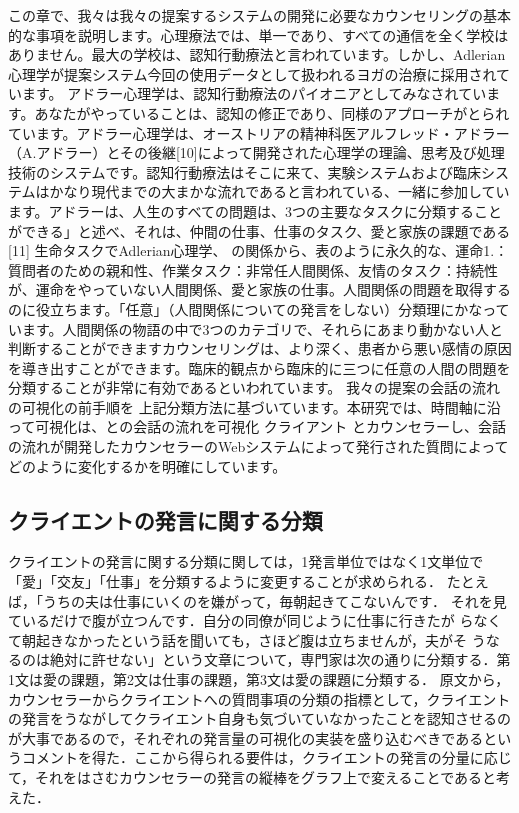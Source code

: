 \documentclass[shuuron]{kuee}
\begin{document}
 この章で、我々は我々の提案するシステムの開発に必要なカウンセリングの基本的な事項を説明します。心理療法では、単一であり、すべての通信を全く学校はありません。最大の学校は、認知行動療法と言われています。しかし、Adlerian心理学が提案システム今回の使用データとして扱われるヨガの治療に採用されています。
アドラー心理学は、認知行動療法のパイオニアとしてみなされています。あなたがやっていることは、認知の修正であり、同様のアプローチがとられています。アドラー心理学は、オーストリアの精神科医アルフレッド・アドラー（A.アドラー）とその後継[10]によって開発された心理学の理論、思考及び処理技術のシステムです。認知行動療法はそこに来て、実験システムおよび臨床システムはかなり現代までの大まかな流れであると言われている、一緒に参加しています。アドラーは、人生のすべての問題は、3つの主要なタスクに分類することができる」と述べ、それは、仲間の仕事、仕事のタスク、愛と家族の課題である[11] 生命タスクでAdlerian心理学、 の関係から、表のように永久的な、運命1.：質問者のための親和性、作業タスク：非常任人間関係、友情のタスク：持続性が、運命をやっていない人間関係、愛と家族の仕事。人間関係の問題を取得するのに役立ちます。「任意」（人間関係についての発言をしない）分類理にかなっています。人間関係の物語の中で3つのカテゴリで、それらにあまり動かない人と判断することができますカウンセリングは、より深く、患者から悪い感情の原因を導き出すことができます。臨床的観点から臨床的に三つに任意の人間の問題を分類することが非常に有効であるといわれています。
我々の提案の会話の流れの可視化の前手順を 上記分類方法に基づいています。本研究では、時間軸に沿って可視化は、との会話の流れを可視化 クライアント とカウンセラーし、会話の流れが開発したカウンセラーのWebシステムによって発行された質問によってどのように変化するかを明確にしています。


\subsection{クライエントの発言に関する分類}



クライエントの発言に関する分類に関しては，1発言単位ではなく1文単位で「愛」「交友」「仕事」を分類するように変更することが求められる．
たとえば，「うちの夫は仕事にいくのを嫌がって，毎朝起きてこないんです．
それを見ているだけで腹が立つんです．自分の同僚が同じように仕事に行きたが
らなくて朝起きなかったという話を聞いても，さほど腹は立ちませんが，夫がそ
うなるのは絶対に許せない」という文章について，専門家は次の通りに分類する．第1文は愛の課題，第2文は仕事の課題，第3文は愛の課題に分類する．
原文から，カウンセラーからクライエントへの質問事項の分類の指標として，クライエントの発言をうながしてクライエント自身も気づいていなかったことを認知させるのが大事であるので，それぞれの発言量の可視化の実装を盛り込むべきであるというコメントを得た．ここから得られる要件は，クライエントの発言の分量に応じて，それをはさむカウンセラーの発言の縦棒をグラフ上で変えることであると考えた．
\end{document}
